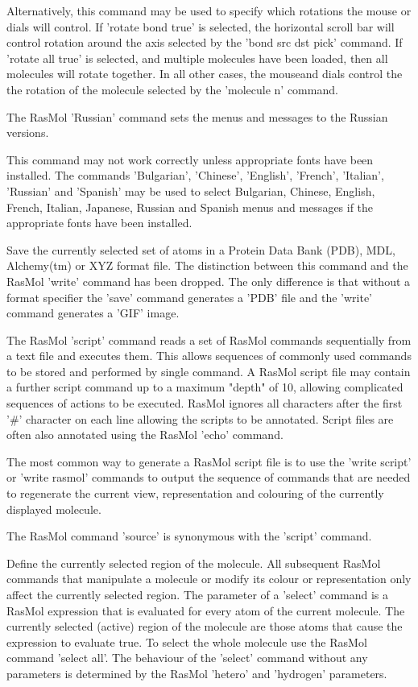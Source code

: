 Alternatively, this command may be used to specify which rotations
the mouse or dials will control.  If
'rotate bond true'
is selected, the horizontal scroll bar will control rotation around
the axis selected by the
'bond src dst pick'
command.  If
'rotate all true'
is selected, and multiple molecules have been loaded, then all molecules
will rotate together.  In all other cases, the mouseand dials control the
the rotation of the molecule selected by the
'molecule n'
command.

The RasMol
'Russian'
command sets the menus and messages to the Russian versions.

This command may not work correctly unless appropriate fonts
have been installed.  The commands
'Bulgarian',
'Chinese',
'English',
'French',
'Italian',
'Russian'
and
'Spanish'
may be used to select Bulgarian, Chinese, English, French,
Italian, Japanese, Russian and Spanish menus and messages if the
appropriate fonts have been installed.

Save the currently selected set of atoms in a Protein
Data Bank (PDB), MDL, Alchemy(tm) or XYZ format file.
The distinction between this command and the RasMol
'write'
command has been dropped. The only difference is that without a format
specifier the
'save'
command generates a
'PDB'
file and the
'write'
command generates a
'GIF'
image.

The RasMol
'script'
command reads a set of RasMol commands sequentially from a
text file and executes them. This allows sequences of commonly used
commands to be stored and performed by single command. A RasMol script
file may contain a further script command up to a maximum "depth" of 10,
allowing complicated sequences of actions to be executed. RasMol
ignores all characters after the first '#' character on each line
allowing the scripts to be annotated. Script files are often also
annotated using the RasMol
'echo'
command.

The most common way to generate a RasMol script file is to use the
'write script'
or
'write rasmol'
commands to output the sequence of commands that are needed to
regenerate the current view, representation and colouring of the
currently displayed molecule.

The RasMol command
'source'
is synonymous with the
'script'
command.

Define the currently selected region of the molecule. All subsequent RasMol
commands that manipulate a molecule or modify its colour or representation
only affect the currently selected region. The parameter of a
'select'
command is a RasMol expression that is evaluated for every atom of the
current molecule. The currently selected (active) region of the molecule
are those atoms that cause the expression to evaluate true. To select
the whole molecule use the RasMol command
'select all'.
The behaviour of the
'select'
command without any parameters is determined by the RasMol
'hetero'
and
'hydrogen'
parameters.


